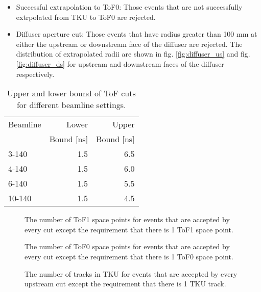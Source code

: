 \begin{itemize}
\item{Successful extrapolation to ToF0:} Those events that are not successfully
extrpolated from TKU to ToF0 are rejected.
\item{Diffuser aperture cut:} Those events that have radius greater than 100 mm
at either the upstream or downstream face of the diffuser are rejected. The 
distribution of extrapolated radii are shown in fig. \ref{fig:diffuser_us} and
fig. \ref{fig:diffuser_ds} for upstream and downstream faces of the diffuser 
respectively.
\end{itemize}

\begin{table}
\caption{Upper and lower bound of ToF cuts for different beamline settings.
\label{tab:tof01_cut}}
\centering
\begin{tabular}[pos]{l|rr}
Beamline & Lower       & Upper \\
         & Bound [ns]  & Bound [ns] \\
\hline
3-140    & 1.5          & 6.5 \\
4-140    & 1.5          & 6.0 \\
6-140    & 1.5          & 5.5 \\
10-140   & 1.5          & 4.5 \\
\end{tabular}
\end{table}

\begin{figure}[!tbh]
    \centering
    {The number of ToF1 space points for events that are accepted by every cut 
     except the requirement that there is 1 ToF1 space point.\label{fig:tof1_n_sp}}
\end{figure}

\begin{figure}[!tbh]
    \centering
    {The number of ToF0 space points for events that are accepted by every cut 
      except the requirement that there is 1 ToF0 space point.\label{fig:tof0_n_sp}}
\end{figure}

\begin{figure}[!tbh]
    \centering
    {The number of tracks in TKU for events that are accepted by every upstream 
     cut except the requirement that there is 1 TKU track.\label{fig:tku_n_tk}}
\end{figure}

